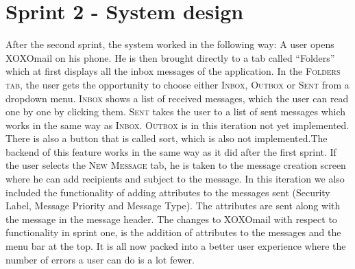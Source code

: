 \section{Sprint 2 - System design}
After the second sprint, the system worked in the following way: A user opens XOXOmail on his phone. He is then brought directly to a tab called “Folders” which at first displays all the inbox messages of the application.
\newline
\newline
In the \textsc{Folders tab}, the user gets the opportunity to choose either  \textsc{Inbox},  \textsc{Outbox} or  \textsc{Sent} from a dropdown menu.  \textsc{Inbox} shows a list of received messages, which the user can read one by one by clicking them. \textsc{Sent} takes the user to a list of sent messages which works in the same way as \textsc{Inbox}. \textsc{Outbox} is in this iteration not yet implemented. There is also a button that is called sort, which is also not implemented.The backend of this feature works in the same way as it did after the first sprint. 
\newline
\newline
If the user selects the \textsc{New Message} tab, he is taken to the message creation screen where he can add recipients and subject to the message. In this iteration we also included the functionality of adding attributes to the messages sent (Security Label, Message Priority and Message Type). The attributes are sent along with the message in the message header.
\newline
\newline
The changes to XOXOmail with respect to functionality in sprint one, is the addition of attributes to the messages and the menu bar at the top. It is all now packed into a better user experience where the number of errors a user can do is a lot fewer. 
